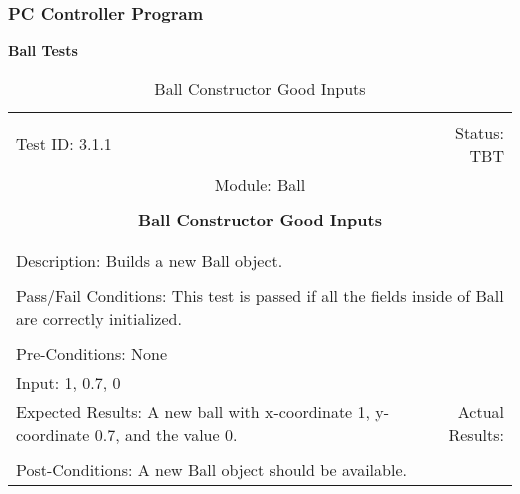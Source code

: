 \documentclass[titlepage]{article}
\begin{document}
\subsubsection{PC Controller Program}
\large{\textbf{Ball Tests}}
\begin{center}%
\begin{table}[h!]
\begin{tabular}{|l r|}\hline&\\[-2mm]
	Test ID: 3.1.1	&Status: TBT\\[-3mm]
	\multicolumn{2}{|c|}{Module: Ball}\\&\\
	\multicolumn{2}{|c|}{\textbf{\large{Ball Constructor Good Inputs}}}\\&\\\hline&\\[-3mm]
	\multicolumn{2}{|p{\textwidth}|}{Description: Builds a new Ball object.}\\[1mm]\hline&\\[-3mm]
	\multicolumn{2}{|p{\textwidth}|}{Pass/Fail Conditions: This test is passed if all the fields inside of Ball are correctly initialized.}\\[1mm]\hline&\\[-3mm]
	\multicolumn{2}{|p{\textwidth}|}{Pre-Conditions: None}\\[4mm]
	\multicolumn{2}{|p{\textwidth}|}{Input: 1, 0.7, 0}\\[2mm]\hline
	\multicolumn{1}{|p{0.49\textwidth}}{Expected Results: A new ball with x-coordinate 1, y-coordinate 0.7, and the value 0.}	&\multicolumn{1}{|p{0.45\textwidth}|}{Actual Results:}\\\hline&\\[-3mm]
	\multicolumn{2}{|p{\textwidth}|}{Post-Conditions: A new Ball object should be available.}\\\hline
\end{tabular}
\caption{Ball Constructor Good Inputs}
\end{table}
\end{center}
\newpage
\end{document}
